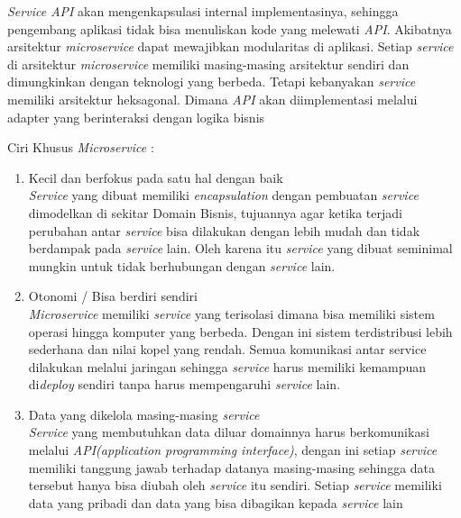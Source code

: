 \textit{Service API} akan mengenkapsulasi internal implementasinya, sehingga pengembang aplikasi tidak bisa menuliskan kode yang melewati \textit{API}. Akibatnya arsitektur \textit{microservice} dapat mewajibkan modularitas di aplikasi.  Setiap \textit{service} di arsitektur \textit{microservice} memiliki masing-masing arsitektur sendiri dan dimungkinkan dengan teknologi yang berbeda. Tetapi kebanyakan \textit{service} memiliki arsitektur heksagonal. Dimana \textit{API} akan diimplementasi melalui adapter yang berinteraksi dengan logika bisnis \cite{BC4}

Ciri Khusus \textit{Microservice} \cite{ECD,BC4,1C7}:	
\begin{enumerate}[leftmargin=1.3cm]
	\item Kecil dan berfokus pada satu hal dengan baik\\
	\textit{Service} yang dibuat memiliki \textit{encapsulation} dengan pembuatan \textit{service} dimodelkan di sekitar Domain Bisnis, tujuannya agar ketika terjadi perubahan antar \textit{service} bisa dilakukan dengan lebih mudah dan tidak berdampak pada \textit{service} lain. Oleh karena itu \textit{service} yang dibuat seminimal mungkin untuk tidak berhubungan dengan \textit{service} lain. 
	\item Otonomi / Bisa berdiri sendiri\\
	\textit{Microservice} memiliki \textit{service} yang terisolasi dimana bisa memiliki sistem operasi hingga komputer yang berbeda. Dengan ini sistem terdistribusi lebih sederhana dan nilai kopel yang rendah. Semua komunikasi antar service dilakukan melalui jaringan sehingga \textit{service} harus memiliki kemampuan di\textit{deploy} sendiri tanpa harus mempengaruhi \textit{service} lain.
	\item Data yang dikelola masing-masing \textit{service}\\
	\textit{Service} yang membutuhkan data diluar domainnya harus berkomunikasi melalui \textit{API(application programming interface)}, dengan ini setiap \textit{service} memiliki tanggung jawab terhadap datanya masing-masing sehingga data tersebut hanya bisa diubah oleh \textit{service} itu sendiri. Setiap \textit{service} memiliki data yang pribadi dan data yang bisa dibagikan kepada \textit{service} lain
\end{enumerate}	

